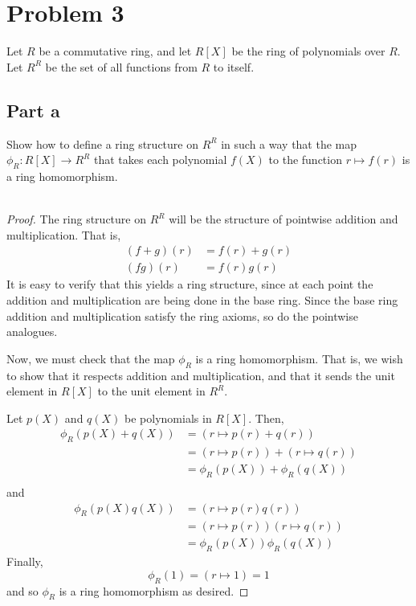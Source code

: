 \documentclass[12pt,reqno]{amsart}
\begin{document}
\newpage
\section*{Problem 3}
Let $R$ be a commutative ring, and let $R[X]$ be the ring of polynomials over
$R$. Let $R^R$ be the set of all functions from $R$ to itself.
\subsection*{Part a}
Show how to define a ring structure on $R^R$ in such a way that the map
$\phi_R:R[X]\to R^R$ that takes each polynomial $f(X)$ to the function $r\mapsto
f(r)$ is a ring homomorphism.
\\
\\
\begin{proof}
    The ring structure on $R^R$ will be the structure of pointwise addition and
    multiplication. That is,
    \[
\begin{aligned}
    (f+g)(r) &= f(r) + g(r)\\
    (fg)(r) &= f(r)g(r)
\end{aligned}
    \]
    It is easy to verify that this yields a ring structure, since at each point
    the addition and multiplication are being done in the base ring. Since the
    base ring addition and multiplication satisfy the ring axioms, so do the
    pointwise analogues.

    Now, we must check that the map $\phi_R$ is a ring homomorphism. That is, we
    wish to show that it respects addition and multiplication, and that it sends
    the unit element in $R[X]$ to the unit element in $R^R$.

    Let $p(X)$ and $q(X)$ be polynomials in $R[X]$. Then, 
    \[
        \begin{aligned}
        \phi_R(p(X)+q(X)) &= (r\mapsto p(r)+q(r))\\
                        &=(r\mapsto p(r)) + (r\mapsto q(r))\\
                        &=\phi_R(p(X)) + \phi_R(q(X))\\
    \end{aligned}
    \]
and
    \[
\begin{aligned}
    \phi_R(p(X)q(X)) &= (r\mapsto p(r)q(r))\\
                    &= (r\mapsto p(r))(r\mapsto q(r))\\
                    &=\phi_R(p(X))\phi_R(q(X))
\end{aligned}
    \]
Finally,
\[
    \phi_R(1) = (r\mapsto 1) = 1
\]
and so $\phi_R$ is a ring homomorphism as desired.
\end{proof}
\end{document}
